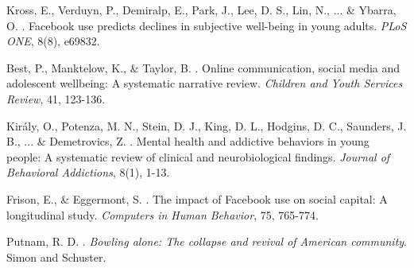 \documentclass[12pt,a4paper]{article}
\begin{document}

\begin{thebibliography}{99}

Kross, E., Verduyn, P., Demiralp, E., Park, J., Lee, D. S., Lin, N., ... \& Ybarra, O. . Facebook use predicts declines in subjective well-being in young adults. \emph{PLoS ONE}, 8(8), e69832.

Best, P., Manktelow, K., \& Taylor, B. . Online communication, social media and adolescent wellbeing: A systematic narrative review. \emph{Children and Youth Services Review}, 41, 123-136.

Király, O., Potenza, M. N., Stein, D. J., King, D. L., Hodgins, D. C., Saunders, J. B., ... \& Demetrovics, Z. . Mental health and addictive behaviors in young people: A systematic review of clinical and neurobiological findings. \emph{Journal of Behavioral Addictions}, 8(1), 1-13.

Frison, E., \& Eggermont, S. . The impact of Facebook use on social capital: A longitudinal study. \emph{Computers in Human Behavior}, 75, 765-774.

Putnam, R. D. . \emph{Bowling alone: The collapse and revival of American community}. Simon and Schuster.

\end{thebibliography}
\end{document}
